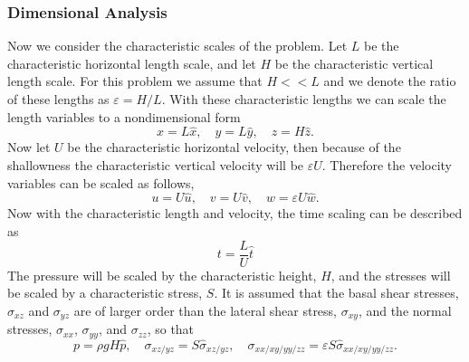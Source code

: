 \subsubsection{Dimensional Analysis}
  Now we consider the characteristic scales of the problem.
  Let \(L\) be the characteristic horizontal length scale, and let \(H\) be the
  characteristic vertical length scale.
  For this problem we assume that \(H << L\) and we denote the ratio of these
  lengths as \(\varepsilon = H/L\).
  With these characteristic lengths we can scale the length variables to a
  nondimensional form
  \begin{equation}
    x = L\hat{x}, \quad y = L\hat{y}, \quad z = H\hat{z}.
  \end{equation}
  Now let \(U\) be the characteristic horizontal velocity, then because of the
  shallowness the characteristic vertical velocity will be \(\varepsilon U\).
  Therefore the velocity variables can be scaled as follows,
  \begin{equation}
    u = U\hat{u}, \quad v = U\hat{v}, \quad w = \varepsilon U \hat{w}.
  \end{equation}
  Now with the characteristic length and velocity, the time scaling can be described
  as
  \begin{equation}
    t = \frac{L}{U}\hat{t}
  \end{equation}
  The pressure will be scaled by the characteristic height, \(H\), and the stresses
  will be scaled by a characteristic stress, \(S\).
  It is assumed that the basal shear stresses, \(\sigma_{xz}\) and \(\sigma_{yz}\) are
   of larger order than the lateral shear stress, \(\sigma_{xy}\), and the normal
  stresses, \(\sigma_{xx}\), \(\sigma_{yy}\), and \(\sigma_{zz}\), so that
  \begin{equation}
    p = \rho g H \hat{p}, \quad \sigma_{xz/yz} = S\hat{\sigma}_{xz/yz}, \quad
    \sigma_{xx/xy/yy/zz} = \varepsilon S \hat{\sigma}_{xx/xy/yy/zz}.
  \end{equation}

